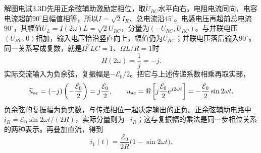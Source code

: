 \documentclass[UTF8,fontset=fandol,a4paper,11pt]{ctexart}
\begin{document}
解图电试3.3D先用正余弦辅助激励定相位，取$\widetilde U_{RC}$水平向右。电阻电流同向，电容电流超前$90^\circ$且幅值相等，所以$I=\sqrt2 I_R$、总电流沿$45^\circ$。电感电压再超前总电流$90^\circ$，其幅值$U_L=I(2\omega)L=\sqrt2 U_{RC}$，分量为$(-U_{RC},U_{RC})$。与并联电压$(U_{RC},0)$相加，输入电压恰沿竖直向上，幅值仍为$U_{RC}$；并联电压落后输入$90^\circ$。同一关系写成复数，就是$\Omega^2LC=1$、$\Omega L/R=1$时
\[
H(2\omega)=\frac1j=-j.
\]
实际交流输入为负余弦，复振幅是$-\mathcal E_0/2$。把它与上述传递系数相乘再取实部，
\[
\widetilde u_{\rm ac}
=(-j)\left(-\frac{\mathcal E_0}{2}\right)
=j\frac{\mathcal E_0}{2},\qquad
u_{\rm ac}=\Re\left[j\frac{\mathcal E_0}{2}e^{j2\omega t}\right]
=-\frac{\mathcal E_0}{2}\sin2\omega t.
\]
负余弦的复振幅为负实数，与传递相位一起决定输出的正负。正余弦辅助电路中$i_R=\mathcal E_0\sin2\omega t/(2R)$，实际分量则为$-i_R$；这与复振幅的乘法是同一步相位关系的两种表示。再叠加直流，得到
\[
\boxed{i_1(t)=\frac{\mathcal E_0}{2R}
\bigl(1-\sin2\omega t\bigr)}.
\]
\end{document}
